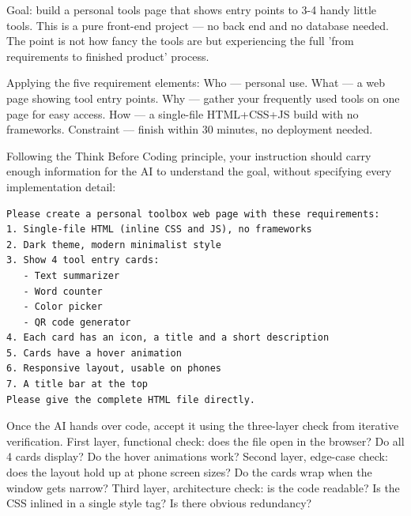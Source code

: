 



Goal: build a personal tools page that shows entry points to 3-4 handy little tools. This is a pure front-end project — no back end and no database needed. The point is not how fancy the tools are but experiencing the full 'from requirements to finished product' process.

Applying the five requirement elements: Who — personal use. What — a web page showing tool entry points. Why — gather your frequently used tools on one page for easy access. How — a single-file HTML+CSS+JS build with no frameworks. Constraint — finish within 30 minutes, no deployment needed.


Following the Think Before Coding principle, your instruction should carry enough information for the AI to understand the goal, without specifying every implementation detail:

\begin{lstlisting}
Please create a personal toolbox web page with these requirements:
1. Single-file HTML (inline CSS and JS), no frameworks
2. Dark theme, modern minimalist style
3. Show 4 tool entry cards:
   - Text summarizer
   - Word counter
   - Color picker
   - QR code generator
4. Each card has an icon, a title and a short description
5. Cards have a hover animation
6. Responsive layout, usable on phones
7. A title bar at the top
Please give the complete HTML file directly.
\end{lstlisting}


Once the AI hands over code, accept it using the three-layer check from iterative verification. First layer, functional check: does the file open in the browser? Do all 4 cards display? Do the hover animations work? Second layer, edge-case check: does the layout hold up at phone screen sizes? Do the cards wrap when the window gets narrow? Third layer, architecture check: is the code readable? Is the CSS inlined in a single style tag? Is there obvious redundancy?

